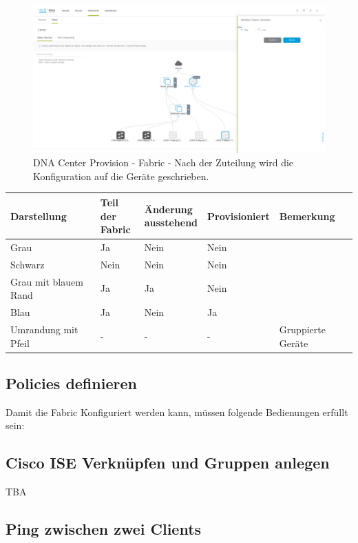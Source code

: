\begin{figure}[H]
	\centering
	\includegraphics[width=16cm]{img/dna-center-fabric-1.png}
	\caption{DNA Center Provision - Fabric - Nach der Zuteilung wird die Konfiguration auf die Geräte geschrieben.}
	\label{fig:IP Base and Services}
\end{figure}


\begin{tabular}{| l | l | l | l | l |}
	\hline
	\textbf{Darstellung} & \makecell{\textbf{Teil der}\\ \textbf{Fabric}} & \makecell{\textbf{Änderung}\\ \textbf{ausstehend}} & \textbf{Provisioniert} & \textbf{Bemerkung} \\
	\hline
	Grau & Ja & Nein & Nein & \\
	Schwarz & Nein & Nein & Nein & \\
	Grau mit blauem Rand & Ja & Ja & Nein & \\
	Blau & Ja & Nein & Ja & \\
	Umrandung mit Pfeil & - & - & - & Gruppierte Geräte\\	
	\hline
\end{tabular}

\subsection{Policies definieren}
Damit die Fabric Konfiguriert werden kann, müssen folgende Bedienungen erfüllt sein:


\subsection{Cisco ISE Verknüpfen und Gruppen anlegen}
TBA

\subsection{Ping zwischen zwei Clients}

